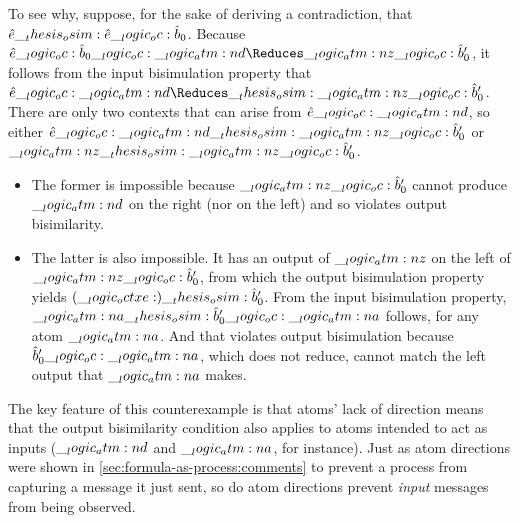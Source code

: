To see why, suppose, for the sake of deriving a contradiction, that $\hat{e} \__thesis_osim: \hat{e} \__logic_oc: \hat{b}_0$.
Because $\defp{e} \oc \defp{b}_0 \oc \atm{d} \Reduces \atm{z} \oc \defp{b}'_0$, it follows from the input bisimulation property that $\defp{e} \oc \atm{d} \Reduces\osim \atm{z} \oc \defp{b}'_0$.
There are only two contexts that can arise from $\hat{e} \__logic_oc: \__logic_atm:n {d}$, so either $\hat{e} \__logic_oc: \__logic_atm:n {d} \__thesis_osim: \__logic_atm:n {z} \__logic_oc: \hat{b}'_0$ or $\__logic_atm:n {z} \__thesis_osim: \__logic_atm:n {z} \__logic_oc: \hat{b}'_0$.
\begin{itemize}
\item The former is impossible because $\__logic_atm:n {z} \__logic_oc: \hat{b}'_0$ cannot produce $\__logic_atm:n {d}$ on the right (nor on the left) and so violates output bisimilarity.

\item The latter is also impossible.
It has an output of $\__logic_atm:n {z}$ on the left of $\__logic_atm:n {z} \__logic_oc: \hat{b}'_0$, from which the output bisimulation property yields $(\__logic_octxe:) \__thesis_osim: \hat{b}'_0$.
From the input bisimulation property, $\__logic_atm:n {a} \__thesis_osim: \hat{b}'_0 \__logic_oc: \__logic_atm:n {a}$ follows, for any atom $\__logic_atm:n {a}$.
And that violates output bisimulation because $\hat{b}'_0 \__logic_oc: \__logic_atm:n {a}$, which does not reduce, cannot match the left output that $\__logic_atm:n {a}$ makes.
\end{itemize}

The key feature of this counterexample is that atoms' lack of direction means that the output bisimilarity condition also applies to atoms intended to act as inputs ($\__logic_atm:n {d}$ and $\__logic_atm:n {a}$, for instance).
Just as atom directions were shown in \cref{sec:formula-as-process:comments} to prevent a process from capturing a message it just sent, so do atom directions prevent \emph{input} messages from being observed.



